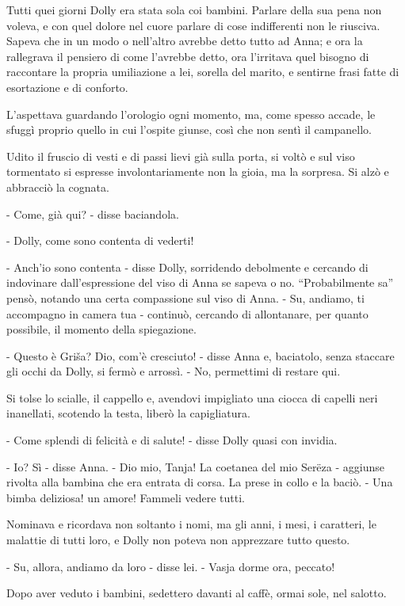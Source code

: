 Tutti quei giorni Dolly era stata sola coi bambini. Parlare della sua pena non voleva, e con quel dolore nel cuore parlare di cose indifferenti non le riusciva. Sapeva che in un modo o nell'altro avrebbe detto tutto ad Anna; e ora la rallegrava il pensiero di come l'avrebbe detto, ora l'irritava quel bisogno di raccontare la propria umiliazione a lei, sorella del marito, e sentirne frasi fatte di esortazione e di conforto. 

L'aspettava guardando l'orologio ogni momento, ma, come spesso accade, le sfuggì proprio quello in cui l'ospite giunse, così che non sentì il campanello. 

Udito il fruscio di vesti e di passi lievi già sulla porta, si voltò e sul viso tormentato si espresse involontariamente non la gioia, ma la sorpresa. Si alzò e abbracciò la cognata. 

- Come, già qui? - disse baciandola. 

- Dolly, come sono contenta di vederti! 

- Anch'io sono contenta - disse Dolly, sorridendo debolmente e cercando di indovinare dall'espressione del viso di Anna se sapeva o no. ``Probabilmente sa'' pensò, notando una certa compassione sul viso di Anna. - Su, andiamo, ti accompagno in camera tua - continuò, cercando di allontanare, per quanto possibile, il momento della spiegazione. 

- Questo è Griša? Dio, com'è cresciuto! - disse Anna e, baciatolo, senza staccare gli occhi da Dolly, si fermò e arrossì. - No, permettimi di restare qui. 

Si tolse lo scialle, il cappello e, avendovi impigliato una ciocca di capelli neri inanellati, scotendo la testa, liberò la capigliatura. 

- Come splendi di felicità e di salute! - disse Dolly quasi con invidia. 

- Io? Sì - disse Anna. - Dio mio, Tanja! La coetanea del mio Serëza - aggiunse rivolta alla bambina che era entrata di corsa. La prese in collo e la baciò. - Una bimba deliziosa! un amore! Fammeli vedere tutti. 

Nominava e ricordava non soltanto i nomi, ma gli anni, i mesi, i caratteri, le malattie di tutti loro, e Dolly non poteva non apprezzare tutto questo. 

- Su, allora, andiamo da loro - disse lei. - Vasja dorme ora, peccato! 

Dopo aver veduto i bambini, sedettero davanti al caffè, ormai sole, nel salotto. 

